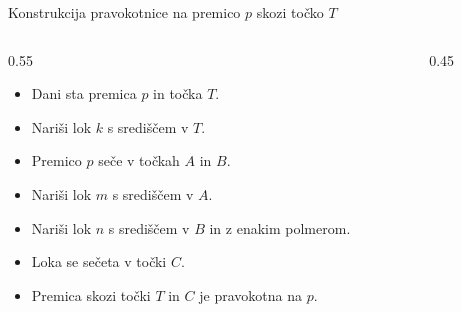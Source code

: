 \begin{frame}{Konstrukcija pravokotnice na premico $p$ skozi točko $T$}

\begin{columns}
	
	\begin{column}{0.55\textwidth}
			\begin{itemize}[<+->]
			 \item Dani sta premica $p$ in točka $T$.
			 \item Nariši lok $k$ s središčem v $T$.
			 \item Premico $p$ seče v točkah $A$ in $B$.
			 \item Nariši lok $m$ s središčem v $A$.
			 \item Nariši lok $n$ s središčem v $B$ in z enakim polmerom.
			 \item Loka se sečeta v točki $C$.
			 \item Premica skozi točki $T$ in $C$ je pravokotna na $p$.
		  \end{itemize}
	\end{column}
		
	\begin{column}{0.45\textwidth}
		  \vfill
\end{column}
\end{columns}
\end{frame}
